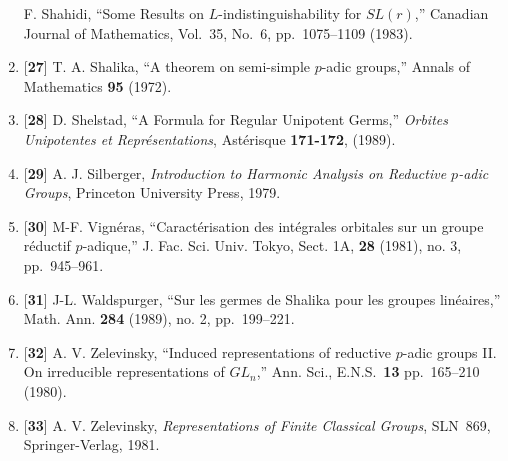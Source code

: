\documentclass{amsart}
\begin{document}
\begin{enumerate}[label=]
  F. Shahidi,
  ``Some Results on $L$-indistinguishability for $SL(r)$,''
  Canadian Journal of Mathematics, Vol.~35, No.~6,
  pp.~1075--1109 (1983).
%
\item{[{\bf 27}]}
  T. A. Shalika,
  ``A theorem on semi-simple $p$-adic groups,''
  Annals of Mathematics {\bf 95} (1972).
%
\item{[{\bf 28}]}
  D. Shelstad,
  ``A Formula for Regular Unipotent Germs,''
  {\sl Orbites Unipotentes et Repr\'esentations},
  Ast\'erisque {\bf 171-172}, (1989).
%
\item{[{\bf 29}]}
  A. J. Silberger,
  {\sl Introduction to Harmonic Analysis on Reductive $p$-adic Groups},
  Princeton University Press, 1979.
%
\item{[{\bf 30}]}
  M-F. Vign\'eras,
  ``Caract\'erisation des int\'egrales orbitales sur un
     groupe r\'eductif $p$-adique,''
     J. Fac. Sci. Univ. Tokyo,
     Sect. 1A,
     {\bf 28} (1981), no. 3, pp.~945--961.
%
\item{[{\bf 31}]}
  J-L. Waldspurger,
  ``Sur les germes de Shalika pour les groupes lin\'eaires,''
  Math. Ann. {\bf 284} (1989), no. 2, pp.~199--221.
%
\item{[{\bf 32}]}
  A. V. Zelevinsky,
  ``Induced representations of reductive $p$-adic groups II.
     On irreducible representations of $GL_n$,''
  Ann. Sci., E.N.S.~{\bf 13}
  pp.~165--210 (1980).
%
\item{[{\bf 33}]}
  A. V. Zelevinsky,
  {\sl Representations of Finite Classical Groups},
  SLN~869, Springer-Verlag, 1981.
\end{enumerate}
\end{document}

